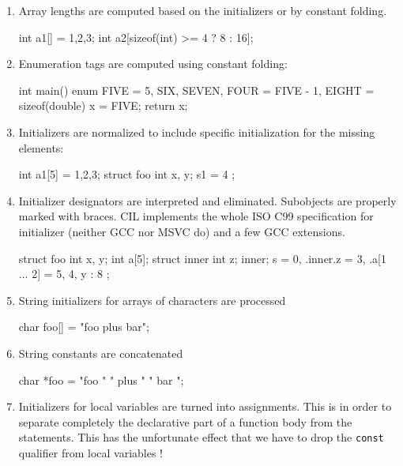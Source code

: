 \documentclass{article}
\def\t#1{{\tt #1}}
\begin{document}
\begin{enumerate}
\item Array lengths are computed based on the initializers or by constant
folding.
\begin{cilcode}[global]
  int a1[] = {1,2,3};
  int a2[sizeof(int) >= 4 ? 8 : 16];
\end{cilcode}

\item Enumeration tags are computed using constant folding:
\begin{cilcode}[global]
int main() {
  enum { 
     FIVE = 5, 
     SIX, SEVEN, 
     FOUR = FIVE - 1, 
     EIGHT = sizeof(double)
  } x = FIVE;
 return x;
}

\end{cilcode}

\item Initializers are normalized to include specific initialization for the
missing elements:
\begin{cilcode}[global]
  int a1[5] = {1,2,3};
  struct foo { int x, y; } s1 = { 4 };
\end{cilcode}

\item Initializer designators are interpreted and eliminated. Subobjects are
properly marked with braces. CIL implements
the whole ISO C99 specification for initializer (neither GCC nor MSVC do) and
a few GCC extensions. 
\begin{cilcode}[global]
  struct foo { 
     int x, y; 
     int a[5];
     struct inner {
        int z;
     } inner;
  } s = { 0, .inner.z = 3, .a[1 ... 2] = 5, 4, y : 8 };
\end{cilcode}

\item String initializers for arrays of characters are processed

\begin{cilcode}[global]
char foo[] = "foo plus bar";
\end{cilcode}

\item String constants are concatenated

\begin{cilcode}[global]
char *foo = "foo " " plus " " bar ";
\end{cilcode}

\item Initializers for local variables are turned into assignments. This is in
order to separate completely the declarative part of a function body from the
statements. This has the unfortunate effect that we have to drop the \t{const}
qualifier from local variables !


\end{enumerate}
\end{document}
